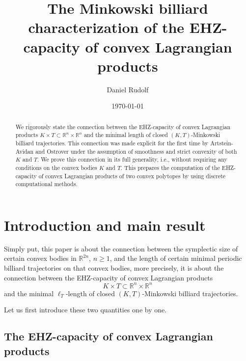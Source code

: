 \documentclass[12pt]{amsart}
\theoremstyle{plain}
\theoremstyle{remark}
\theoremstyle{definition}
\newcommand{\R}{\mathbb{R}}
\def\beqq{\begin{equation*}}\def\eeqq{\end{equation*}}
\begin{document}
\title[The Minkowski billiard characterization of the EHZ-capacity...]{The Minkowski billiard characterization of the EHZ-capacity of convex Lagrangian products}

\author{Daniel Rudolf}


\date{\today}

\maketitle

\begin{abstract}
We rigorously state the connection between the EHZ-capacity of convex Lagrangian products $K\times T\subset\R^n\times\R^n$ and the minimal length of closed $(K,T)$-Minkowski billiard trajectories. This connection was made explicit for the first time by Artstein-Avidan and Ostrover under the assumption of smoothness and strict convexity of both $K$ and $T$. We prove this connection in its full generality, i.e., without requiring any conditions on the convex bodies $K$ and $T$. This prepares the computation of the EHZ-capacity of convex Lagrangian products of two convex polytopes by using discrete computational methods.
\end{abstract}

\section{Introduction and main result}

Simply put, this paper is about the connection between the symplectic size of certain convex bodies in $\R^{2n}$, $n\geq 1$, and the length of certain minimal periodic billiard trajectories on that convex bodies, more precisely, it is about the connection between the EHZ-capacity of convex Lagrangian products
\beqq K\times T\subset\R^n\times\R^n\eeqq
and the minimal $\ell_T$-length of closed $(K,T)$-Minkowski billiard trajectories.

Let us first introduce these two quantities one by one.

\subsection{The EHZ-capacity of convex Lagrangian products}
\end{document}

